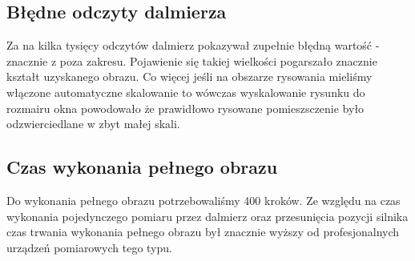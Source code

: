 \subsection {Błędne odczyty dalmierza}
Za na kilka tysięcy odczytów dalmierz pokazywał zupełnie błędną wartość - znacznie z poza zakresu. Pojawienie się takiej wielkości pogarszało znacznie kształt uzyskanego obrazu. Co więcej jeśli na obszarze rysowania mieliśmy włączone automatyczne skalowanie to wówczas wyskalowanie rysunku do rozmairu okna powodowało że prawidłowo rysowane pomieszsczenie było odzwierciedlane w zbyt małej skali.

\subsection {Czas wykonania pełnego obrazu}
Do wykonania pełnego obrazu potrzebowaliśmy 400 kroków. Ze względu na czas wykonania pojedynczego pomiaru przez dalmierz oraz przesunięcia pozycji silnika czas trwania wykonania pełnego obrazu był znacznie wyższy od profesjonalnych urządzeń pomiarowych tego typu.

